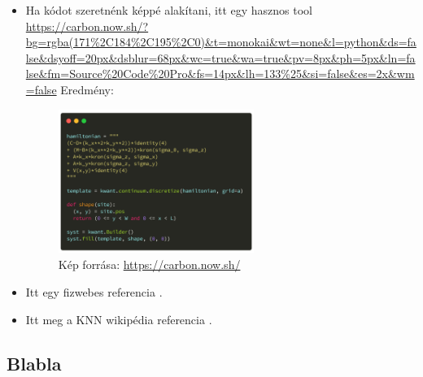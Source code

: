 \documentclass[12pt]{article}
\theoremstyle{plain}
\begin{document}
\begin{itemize}
    \item Ha kódot szeretnénk képpé alakítani, itt egy hasznos tool \url{https://carbon.now.sh/?bg=rgba(171%2C184%2C195%2C0)&t=monokai&wt=none&l=python&ds=false&dsyoff=20px&dsblur=68px&wc=true&wa=true&pv=8px&ph=5px&ln=false&fm=Source%20Code%20Pro&fs=14px&lh=133%25&si=false&es=2x&wm=false}
    Eredmény:
    \begin{figure}[H]
        \begin{center}
        \includegraphics[width=0.6\textwidth]{media/hamilton_def.png}
        \caption{Kép forrása: \url{https://carbon.now.sh/}} 
        \end{center}
    \end{figure}
    \item Itt egy fizwebes referencia \cite{fizweb}.
    \item Itt meg a KNN wikipédia referencia \cite{knnwiki}.
\end{itemize}

\subsection{Blabla}



\end{document}
